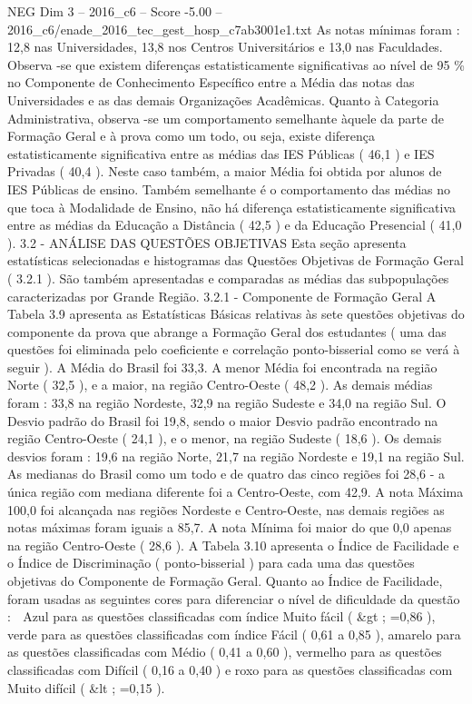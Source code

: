 \begin{textsample}{NEG Dim 3 – 2016\_c6 – Score -5.00 – 2016\_c6/enade\_2016\_tec\_gest\_hosp\_c7ab3001e1.txt}
As notas mínimas foram : 12,8 nas Universidades, 13,8 nos Centros Universitários e 13,0 nas Faculdades.
Observa -se que existem diferenças estatisticamente significativas ao nível de 95 \% no Componente de Conhecimento Específico entre a Média das notas das Universidades e as das demais Organizações Acadêmicas.
Quanto à Categoria Administrativa, observa -se um comportamento semelhante àquele da parte de Formação Geral e à prova como um todo, ou seja, existe diferença estatisticamente significativa entre as médias das IES Públicas ( 46,1 ) e IES Privadas ( 40,4 ).
Neste caso também, a maior Média foi obtida por alunos de IES Públicas de ensino.
Também semelhante é o comportamento das médias no que toca à Modalidade de Ensino, não há diferença estatisticamente significativa entre as médias da Educação a Distância ( 42,5 ) e da Educação Presencial ( 41,0 ). 3.2 - ANÁLISE DAS QUESTÕES OBJETIVAS Esta seção apresenta estatísticas selecionadas e histogramas das Questões Objetivas de Formação Geral ( 3.2.1 ).
São também apresentadas e comparadas as médias das subpopulações caracterizadas por Grande Região. 3.2.1 - Componente de Formação Geral A Tabela 3.9 apresenta as Estatísticas Básicas relativas às sete questões objetivas do componente da prova que abrange a Formação Geral dos estudantes ( uma das questões foi eliminada pelo coeficiente e correlação ponto-bisserial como se verá à seguir ).
A Média do Brasil foi 33,3.
A menor Média foi encontrada na região Norte ( 32,5 ), e a maior, na região Centro-Oeste ( 48,2 ).
As demais médias foram : 33,8 na região Nordeste, 32,9 na região Sudeste e 34,0 na região Sul.
O Desvio padrão do Brasil foi 19,8, sendo o maior Desvio padrão encontrado na região Centro-Oeste ( 24,1 ), e o menor, na região Sudeste ( 18,6 ).
Os demais desvios foram : 19,6 na região Norte, 21,7 na região Nordeste e 19,1 na região Sul.
As medianas do Brasil como um todo e de quatro das cinco regiões foi 28,6 - a única região com mediana diferente foi a Centro-Oeste, com 42,9.
A nota Máxima 100,0 foi alcançada nas regiões Nordeste e Centro-Oeste, nas demais regiões as notas máximas foram iguais a 85,7.
A nota Mínima foi maior do que 0,0 apenas na região Centro-Oeste ( 28,6 ).
A Tabela 3.10 apresenta o Índice de Facilidade e o Índice de Discriminação ( ponto-bisserial ) para cada uma das questões objetivas do Componente de Formação Geral.
Quanto ao Índice de Facilidade, foram usadas as seguintes cores para diferenciar o nível de dificuldade da questão :  Azul para as questões classificadas com índice Muito fácil ( \&gt ; =0,86 ), verde para as questões classificadas com índice Fácil ( 0,61 a 0,85 ), amarelo para as questões classificadas com Médio ( 0,41 a 0,60 ), vermelho para as questões classificadas com Difícil ( 0,16 a 0,40 ) e roxo para as questões classificadas com Muito difícil ( \&lt ; =0,15 ).

\end{textsample}
